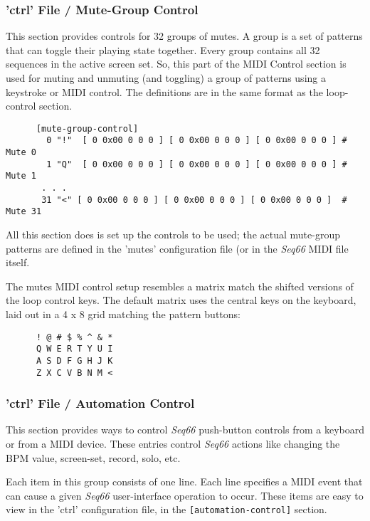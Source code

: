 \subsubsection{'ctrl' File / Mute-Group Control}
\label{subsubsec:configuration_ctrl_mute_group_control}

   This section provides controls for 32 groups of mutes.
   A group is a set of patterns that can toggle their playing state
   together.  Every group contains all 32 sequences in the active screen set.
   So, this part of the MIDI Control section is used for muting and unmuting
   (and toggling) a group of patterns using a keystroke or MIDI control.
   The definitions are in the same format as the loop-control section.

   \begin{verbatim}
      [mute-group-control]
        0 "!"  [ 0 0x00 0 0 0 ] [ 0 0x00 0 0 0 ] [ 0 0x00 0 0 0 ] # Mute 0
        1 "Q"  [ 0 0x00 0 0 0 ] [ 0 0x00 0 0 0 ] [ 0 0x00 0 0 0 ] # Mute 1
       . . .
       31 "<" [ 0 0x00 0 0 0 ] [ 0 0x00 0 0 0 ] [ 0 0x00 0 0 0 ]  # Mute 31
   \end{verbatim}

   All this section does is set up the controls to be used; the actual
   mute-group patterns are defined in the 'mutes' configuration file (or in the
   \textsl{Seq66} MIDI file itself.

   The mutes MIDI control setup resembles a matrix match the shifted versions
   of the loop control keys.  The default matrix
   uses the central keys on the keyboard, laid out in a 4 x 8 grid matching the
   pattern buttons:

   \begin{verbatim}
      ! @ # $ % ^ & *
      Q W E R T Y U I
      A S D F G H J K
      Z X C V B N M <
   \end{verbatim}

\subsubsection{'ctrl' File / Automation Control}
\label{subsubsec:configuration_midi_ctrl_automation}

   This section provides ways to control \textsl{Seq66} push-button controls
   from a keyboard or from a MIDI device.
   These entries control
   \textsl{Seq66} actions like changing the BPM value, screen-set,
   record, solo, etc.
   
   Each item in this group consists of one line.  Each line
   specifies a MIDI event that can cause a given
   \textsl{Seq66} user-interface operation to occur.
   These items are easy to view in the 'ctrl' configuration file,
   in the \texttt{[automation-control]} section.


